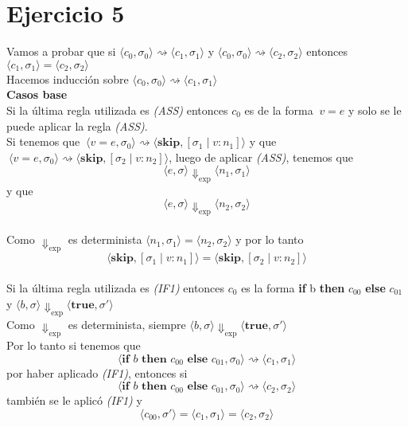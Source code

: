 \documentclass{article}
\begin{document}
\section*{Ejercicio 5}

Vamos a probar que si \(\langle c_0, \sigma_0 \rangle \rightsquigarrow
 \langle c_1, \sigma_1 \rangle \) y \(\langle c_0, \sigma_0 \rangle \rightsquigarrow
 \langle c_2, \sigma_2 \rangle \) entonces  \(\langle c_1, \sigma_1 \rangle = \langle c_2, \sigma_2 \rangle \)\\
 
 Hacemos inducción sobre \(\langle c_0, \sigma_0 \rangle \rightsquigarrow
 \langle c_1, \sigma_1 \rangle \)\\
 \textbf{Casos base}\\
 
Si la última regla utilizada es \textit{(ASS)} entonces \(c_0\) es de la forma \(\ v = e \) y solo se le puede aplicar la regla \textit{(ASS)}.\\
Si tenemos que \(\ \langle v = e, \sigma_0 \rangle \rightsquigarrow
\langle \textbf{skip}, [ \sigma_1 \mid v : n_1 ] \rangle\)  y que \(\ \langle  v = e, \sigma_0 \rangle \rightsquigarrow
\langle \textbf{skip}, [ \sigma_2 \mid v : n_2 ] \rangle\), luego de aplicar \textit{(ASS)}, tenemos que\\
\[\langle e, \sigma \rangle \Downarrow_{\text{exp}} \langle n_1, \sigma_1 \rangle\] y que \[\langle e, \sigma \rangle \Downarrow_{\text{exp}} \langle n_2, \sigma_2 \rangle\]\\
Como \(\Downarrow_{\text{exp}}\) es determinista \(\langle n_1, \sigma_1 \rangle = \langle n_2, \sigma_2 \rangle\)  y por lo tanto \[\langle \textbf{skip}, [ \sigma_1 \mid v : n_1 ] \rangle= \langle \textbf{skip}, [ \sigma_2 \mid v : n_2 ] \rangle\]\\

Si la última regla utilizada es \textit{(IF1)} entonces \(c_0\) es la forma \textbf{if} b \textbf{then} \(c_{00}\) \textbf{else} \(c_{01}\)  y  \( \langle b, \sigma \rangle  \Downarrow_{\text{exp}} \langle \textbf{true}, \sigma' \rangle\) \\
Como \(\Downarrow_{\text{exp}}\) es determinista, siempre \( \langle b, \sigma \rangle  \Downarrow_{\text{exp}} \langle \textbf{true}, \sigma' \rangle\)\\
Por lo tanto si tenemos que
\[ \langle \textbf{if } b\textbf{ then } c_{00} \textbf{ else } c_{01}, \sigma_0 \rangle \rightsquigarrow \langle c_1, \sigma_1 \rangle\]
por haber aplicado \textit{(IF1)}, entonces si
\[ \langle \textbf{if } b\textbf{ then } c_{00} \textbf{ else } c_{01}, \sigma_0 \rangle \rightsquigarrow \langle c_2, \sigma_2 \rangle\]
también se le aplicó \textit{(IF1)} y \[ \langle c_{00}, \sigma'\rangle = \langle c_1, \sigma_1 \rangle = \langle c_2, \sigma_2 \rangle\]\\
\end{document}
